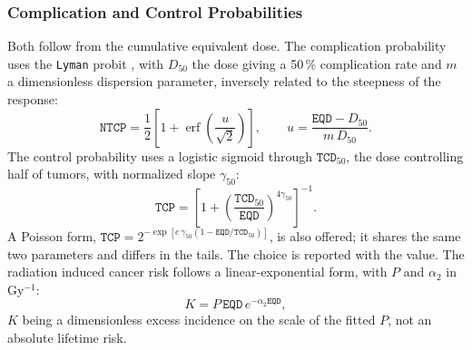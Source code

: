 \documentclass[preprint,12pt,number]{elsarticle}
\begin{document}
\subsubsection{Complication and Control Probabilities}
Both follow from the cumulative equivalent dose. The complication probability uses the \texttt{Lyman} probit \cite{lyman1985}, with $D_{50}$ the dose giving a 50\,\% complication rate and $m$ a dimensionless dispersion parameter, inversely related to the steepness of the response:
    \begin{equation}
    \texttt{NTCP} = \frac{1}{2}\left[1 + \operatorname{erf} \left(\frac{u}{\sqrt{2}}\right)\right], \qquad u = \frac{\texttt{EQD} - D_{50}}{m\,D_{50}} .
    \label{eq:ntcp}
    \end{equation}
The control probability uses a logistic sigmoid through $\texttt{TCD}_{50}$, the dose controlling half of tumors, with normalized slope $\gamma_{50}$:
    \begin{equation}
    \texttt{TCP} = \left[1 + \left(\frac{\texttt{TCD}_{50}}{\texttt{EQD}}\right)^{4\gamma_{50}} \right]^{-1}.
    \label{eq:tcp}
    \end{equation}
A Poisson form, $\texttt{TCP} = 2^{-\exp[e\,\gamma_{50}(1 - \texttt{EQD}/\texttt{TCD}_{50})]}$, is also offered; it shares the same two parameters and differs in the tails. The choice is reported with the value. The radiation induced cancer risk follows a linear-exponential form, with $P$ and $\alpha_2$ in Gy$^{-1}$:
    \begin{equation}
    K = P\,\texttt{EQD}\,e^{-\alpha_2 \texttt{EQD}} ,
    \label{eq:risk}
    \end{equation}
$K$ being a dimensionless excess incidence on the scale of the fitted $P$, not an absolute lifetime risk.
\end{document}
